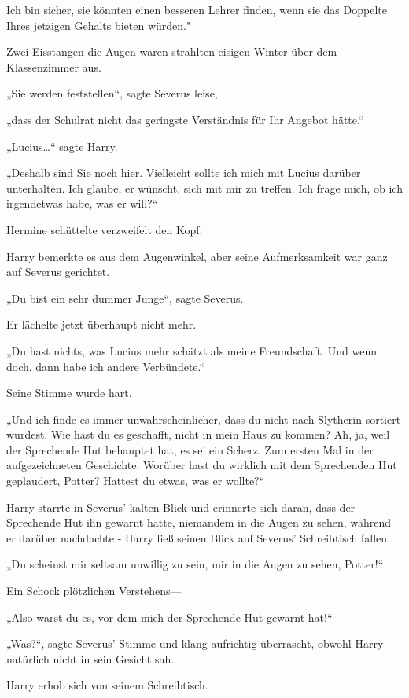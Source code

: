 {Ich bin sicher, sie könnten einen besseren Lehrer finden, wenn sie das Doppelte Ihres jetzigen Gehalts bieten würden."

Zwei Eisstangen die Augen waren strahlten eisigen Winter über dem Klassenzimmer aus.

„Sie werden feststellen“, sagte Severus leise,

„dass der Schulrat nicht das geringste Verständnis für Ihr Angebot hätte.“

„Lucius…“ sagte Harry.

„Deshalb sind Sie noch hier. Vielleicht sollte ich mich mit Lucius darüber unterhalten. Ich glaube, er wünscht, sich mit mir zu treffen. Ich frage mich, ob ich irgendetwas habe, was er will?“

Hermine schüttelte verzweifelt den Kopf.

Harry bemerkte es aus dem Augenwinkel, aber seine Aufmerksamkeit war ganz auf Severus gerichtet.

„Du bist ein sehr dummer Junge“, sagte Severus.

Er lächelte jetzt überhaupt nicht mehr.

„Du hast nichts, was Lucius mehr schätzt als meine Freundschaft. Und wenn doch, dann habe ich andere Verbündete.“

Seine Stimme wurde hart.

„Und ich finde es immer unwahrscheinlicher, dass du nicht nach Slytherin sortiert wurdest. Wie hast du es geschafft, nicht in mein Haus zu kommen? Ah, ja, weil der Sprechende Hut behauptet hat, es sei ein Scherz. Zum ersten Mal in der aufgezeichneten Geschichte. Worüber hast du wirklich mit dem Sprechenden Hut geplaudert, Potter? Hattest du etwas, was er wollte?“

Harry starrte in Severus' kalten Blick und erinnerte sich daran, dass der Sprechende Hut ihn gewarnt hatte, niemandem in die Augen zu sehen, während er darüber nachdachte - Harry ließ seinen Blick auf Severus' Schreibtisch fallen.

„Du scheinst mir seltsam unwillig zu sein, mir in die Augen zu sehen, Potter!“

Ein Schock plötzlichen Verstehens—

„Also warst du es, vor dem mich der Sprechende Hut gewarnt hat!“

„Was?“, sagte Severus' Stimme und klang aufrichtig überrascht, obwohl Harry natürlich nicht in sein Gesicht sah.

Harry erhob sich von seinem Schreibtisch.

}

